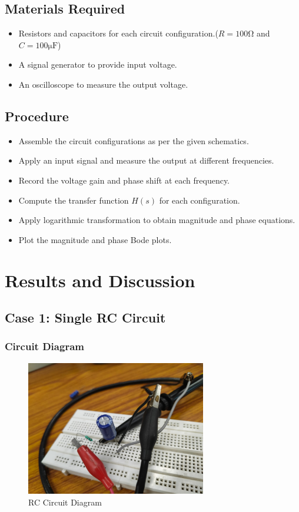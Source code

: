 \documentclass[a4paper,12pt]{article}
\begin{document}
\subsection{Materials Required}
\begin{itemize}
    \item Resistors and capacitors for each circuit configuration.($R=100\si{\ohm}$ and $C=100\si{\micro\farad}$)
    \item A signal generator to provide input voltage.
    \item An oscilloscope to measure the output voltage.

\end{itemize}

\subsection{Procedure}
\begin{itemize}
    \item Assemble the circuit configurations as per the given schematics.
    \item Apply an input signal and measure the output at different frequencies.
    \item Record the voltage gain and phase shift at each frequency.
    \item Compute the transfer function $H(s)$ for each configuration.
    \item Apply logarithmic transformation to obtain magnitude and phase equations.
    \item Plot the magnitude and phase Bode plots.
\end{itemize}

\section{Results and Discussion}

\subsection{Case 1: Single RC Circuit}
\subsubsection{Circuit Diagram}
\begin{figure}[H]
    \centering
    \includegraphics[width=0.7\textwidth]{fig/rc1.jpeg} %
    \caption{RC Circuit Diagram}
\end{figure}
\end{document}
